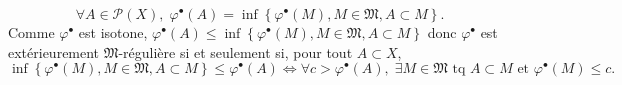\begin{displaymath}
 \forall A \in \mathcal{P}(X),\; \varphi^\bullet(A) = \inf\left\lbrace \varphi^\bullet(M), M \in \mathfrak{M}, A \subset M\right\rbrace.
\end{displaymath}
Comme $\varphi^\bullet$ est isotone, $\varphi^\bullet(A) \leq \inf\left\lbrace \varphi^\bullet(M), M \in \mathfrak{M}, A \subset M\right\rbrace$ donc $\varphi^\bullet$ est extérieurement $\mathfrak{M}$-régulière si et seulement si, pour tout $A \subset X$,
\begin{displaymath}
  \inf\left\lbrace \varphi^\bullet(M), M \in \mathfrak{M}, A \subset M\right\rbrace \leq \varphi^\bullet(A)
 \Leftrightarrow
 \forall c > \varphi^\bullet(A), \; \exists M \in \mathfrak{M} \text{ tq } A \subset M \text{ et } \varphi^\bullet(M) \leq c.
\end{displaymath}

